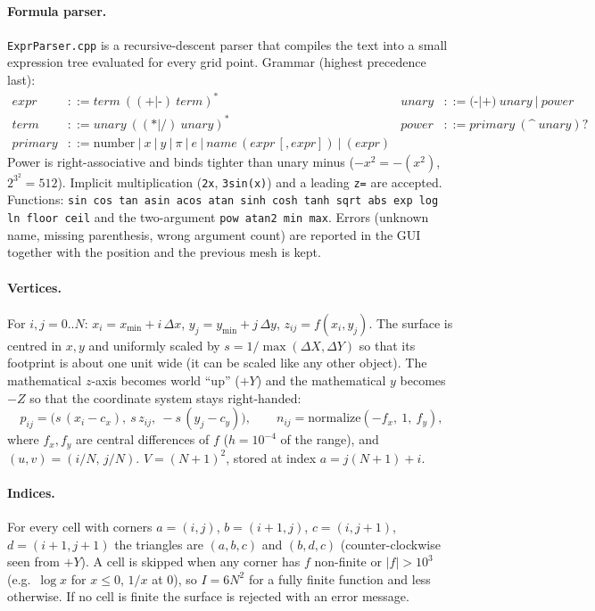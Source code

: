 \documentclass[a4paper, 11pt]{article}
\newcommand{\code}[1]{\texttt{#1}}
\begin{document}
\paragraph{Formula parser.} \code{ExprParser.cpp} is a recursive-descent parser that compiles the text into a small expression tree
evaluated for every grid point. Grammar (highest precedence last):
{\small
\begin{align*}
  \textit{expr} &::= \textit{term}\ ((\texttt{+}|\texttt{-})\ \textit{term})^* &
  \textit{unary} &::= (\texttt{-}|\texttt{+})\ \textit{unary}\ |\ \textit{power}\\
  \textit{term} &::= \textit{unary}\ ((\texttt{*}|\texttt{/})\ \textit{unary})^* &
  \textit{power} &::= \textit{primary}\ (\texttt{\textasciicircum}\ \textit{unary})?\\
  \textit{primary} &::= \text{number}\ |\ x\ |\ y\ |\ \pi\ |\ e\ |\ \textit{name}\,(\textit{expr}\,[,\textit{expr}])\ |\ (\textit{expr}) &&
\end{align*}}
Power is right-associative and binds tighter than unary minus ($-x^2=-(x^2)$, $2^{3^2}=512$). Implicit multiplication
(\code{2x}, \code{3sin(x)}) and a leading \code{z=} are accepted. Functions: \code{sin cos tan asin acos atan sinh cosh tanh sqrt abs exp log ln floor ceil}
and the two-argument \code{pow atan2 min max}. Errors (unknown name, missing parenthesis, wrong argument count) are reported in the
GUI together with the position and the previous mesh is kept.

\paragraph{Vertices.} For $i,j=0..N$: $x_i=x_{\min}+i\,\Delta x$, $y_j=y_{\min}+j\,\Delta y$, $z_{ij}=f(x_i,y_j)$. The surface is centred in $x,y$ and uniformly scaled
by $s=1/\max(\Delta X,\Delta Y)$ so that its footprint is about one unit wide (it can be scaled like any other object). The mathematical $z$-axis
becomes world ``up'' ($+Y$) and the mathematical $y$ becomes $-Z$ so that the coordinate system stays right-handed:
\[
  p_{ij}=\bigl(s\,(x_i-c_x),\ s\,z_{ij},\ -s\,(y_j-c_y)\bigr),\qquad
  n_{ij}=\mathrm{normalize}(-f_x,\ 1,\ f_y),
\]
where $f_x,f_y$ are central differences of $f$ ($h=10^{-4}$ of the range), and $(u,v)=(i/N,\,j/N)$. $V=(N+1)^2$, stored at index $a=j(N+1)+i$.

\paragraph{Indices.} For every cell with corners $a=(i,j)$, $b=(i{+}1,j)$, $c=(i,j{+}1)$, $d=(i{+}1,j{+}1)$ the triangles are
$(a,b,c)$ and $(b,d,c)$ (counter-clockwise seen from $+Y$). A cell is skipped when any corner has $f$ non-finite or $|f|>10^3$
(e.g.\ $\log x$ for $x\le0$, $1/x$ at $0$), so $I=6N^2$ for a fully finite function and less otherwise. If no cell is finite the surface
is rejected with an error message.
\end{document}

